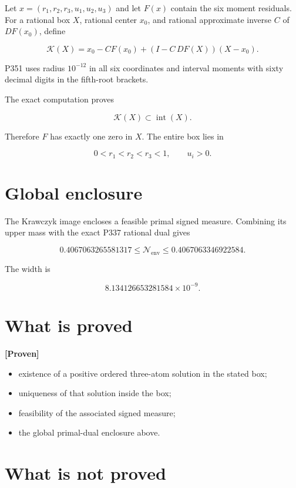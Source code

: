 \documentclass[11pt,a4paper,openany]{report}
\newcommand{\statusProven}{\textcolor{fingreen}{[Proven]}}
\begin{document}
Let \(x=(r_1,r_2,r_3,u_1,u_2,u_3)\) and let \(F(x)\) contain the six moment residuals. For a rational box \(X\), rational center \(x_0\), and rational approximate inverse \(C\) of \(DF(x_0)\), define

\[
\mathcal K(X)=
x_0-CF(x_0)+
\left(I-C\,DF(X)\right)(X-x_0).
\]

P351 uses radius \(10^{-12}\) in all six coordinates and interval moments with sixty decimal digits in the fifth-root brackets.

The exact computation proves

\[
\mathcal K(X)\subset\operatorname{int}(X).
\]

Therefore \(F\) has exactly one zero in \(X\). The entire box lies in

\[
0<r_1<r_2<r_3<1,
\qquad
u_i>0.
\]

\section{Global enclosure}

The Krawczyk image encloses a feasible primal signed measure. Combining its upper mass with the exact P337 rational dual gives

\[
\boxed{
0.4067063265581317
\leq \mathcal N_{\mathrm{env}}
\leq 0.4067063346922584
}.
\]

The width is

\[
8.134126653281584\times10^{-9}.
\]

\section{What is proved}

\textbf{\statusProven{}}

\begin{itemize}
\item 
existence of a positive ordered three-atom solution in the stated box;

\item 
uniqueness of that solution inside the box;

\item 
feasibility of the associated signed measure;

\item 
the global primal-dual enclosure above.

\end{itemize}

\section{What is not proved}
\end{document}
